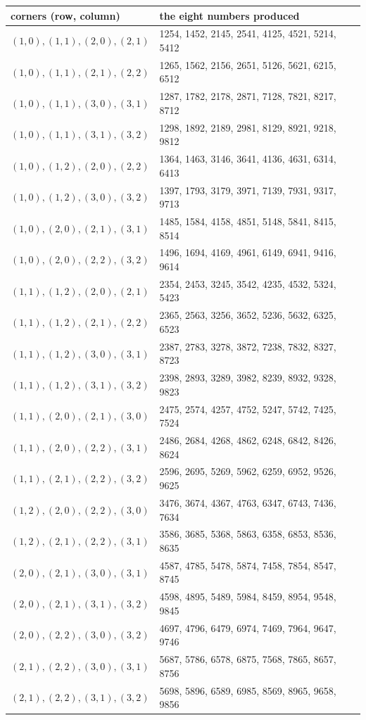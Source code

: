\documentclass[11pt,a4paper]{article}
\theoremstyle{definition}
\theoremstyle{remark}
\begin{document}
\begin{center}
\footnotesize
\begin{tabular}{@{}p{5.0cm}p{9.4cm}@{}}
\toprule
corners (row, column) & the eight numbers produced\\
\midrule
$(1,0),(1,1),(2,0),(2,1)$ & 1254, 1452, 2145, 2541, 4125, 4521, 5214, 5412\\
$(1,0),(1,1),(2,1),(2,2)$ & 1265, 1562, 2156, 2651, 5126, 5621, 6215, 6512\\
$(1,0),(1,1),(3,0),(3,1)$ & 1287, 1782, 2178, 2871, 7128, 7821, 8217, 8712\\
$(1,0),(1,1),(3,1),(3,2)$ & 1298, 1892, 2189, 2981, 8129, 8921, 9218, 9812\\
$(1,0),(1,2),(2,0),(2,2)$ & 1364, 1463, 3146, 3641, 4136, 4631, 6314, 6413\\
$(1,0),(1,2),(3,0),(3,2)$ & 1397, 1793, 3179, 3971, 7139, 7931, 9317, 9713\\
$(1,0),(2,0),(2,1),(3,1)$ & 1485, 1584, 4158, 4851, 5148, 5841, 8415, 8514\\
$(1,0),(2,0),(2,2),(3,2)$ & 1496, 1694, 4169, 4961, 6149, 6941, 9416, 9614\\
$(1,1),(1,2),(2,0),(2,1)$ & 2354, 2453, 3245, 3542, 4235, 4532, 5324, 5423\\
$(1,1),(1,2),(2,1),(2,2)$ & 2365, 2563, 3256, 3652, 5236, 5632, 6325, 6523\\
$(1,1),(1,2),(3,0),(3,1)$ & 2387, 2783, 3278, 3872, 7238, 7832, 8327, 8723\\
$(1,1),(1,2),(3,1),(3,2)$ & 2398, 2893, 3289, 3982, 8239, 8932, 9328, 9823\\
$(1,1),(2,0),(2,1),(3,0)$ & 2475, 2574, 4257, 4752, 5247, 5742, 7425, 7524\\
$(1,1),(2,0),(2,2),(3,1)$ & 2486, 2684, 4268, 4862, 6248, 6842, 8426, 8624\\
$(1,1),(2,1),(2,2),(3,2)$ & 2596, 2695, 5269, 5962, 6259, 6952, 9526, 9625\\
$(1,2),(2,0),(2,2),(3,0)$ & 3476, 3674, 4367, 4763, 6347, 6743, 7436, 7634\\
$(1,2),(2,1),(2,2),(3,1)$ & 3586, 3685, 5368, 5863, 6358, 6853, 8536, 8635\\
$(2,0),(2,1),(3,0),(3,1)$ & 4587, 4785, 5478, 5874, 7458, 7854, 8547, 8745\\
$(2,0),(2,1),(3,1),(3,2)$ & 4598, 4895, 5489, 5984, 8459, 8954, 9548, 9845\\
$(2,0),(2,2),(3,0),(3,2)$ & 4697, 4796, 6479, 6974, 7469, 7964, 9647, 9746\\
$(2,1),(2,2),(3,0),(3,1)$ & 5687, 5786, 6578, 6875, 7568, 7865, 8657, 8756\\
$(2,1),(2,2),(3,1),(3,2)$ & 5698, 5896, 6589, 6985, 8569, 8965, 9658, 9856\\
\bottomrule
\end{tabular}
\end{center}
\end{document}
